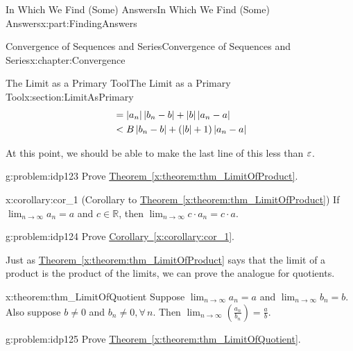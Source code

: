 \begin{partptx}{In Which We Find (Some) Answers}{}{In Which We Find (Some) Answers}{}{}{x:part:FindingAnswers}
\begin{chapterptx}{Convergence of Sequences and Series}{}{Convergence of Sequences and Series}{}{}{x:chapter:Convergence}
\begin{sectionptx}{The Limit as a Primary Tool}{}{The Limit as a Primary Tool}{}{}{x:section:LimitAsPrimary}
\begin{align*}
				& =\left|a_n\right|\left|b_n-b\right|+\left|b\right|\left|a_n-a\right|\\
				& < B\left|b_n-b\right|+\left(\left|b\right|+1\right)\left|a_n-a\right|
			\end{align*}
			\par
			At this point, we should be able to make the last line of this less than \(\varepsilon\).%
			\par
			\begin{problem}{}{g:problem:idp123}%
				 Prove \hyperref[x:theorem:thm_LimitOfProduct]{Theorem~{\xreffont\ref{x:theorem:thm_LimitOfProduct}}}.%
			\end{problem}
			\begin{corollary}{}{}{x:corollary:cor_1}%
				(Corollary to \hyperref[x:theorem:thm_LimitOfProduct]{Theorem~{\xreffont\ref{x:theorem:thm_LimitOfProduct}}}) If \(\displaystyle\lim_{n\rightarrow\infty}a_n=a\) and \(c\in\mathbb{R}\), then \(\displaystyle\lim_{n\rightarrow\infty}c\cdot a_n=c\cdot a\).%
			\end{corollary}
			\begin{problem}{}{g:problem:idp124}%
				 Prove  \hyperref[x:corollary:cor_1]{Corollary~{\xreffont\ref{x:corollary:cor_1}}}.%
			\end{problem}
			Just as \hyperref[x:theorem:thm_LimitOfProduct]{Theorem~{\xreffont\ref{x:theorem:thm_LimitOfProduct}}} says that the limit of a product is the product of the limits, we can prove the analogue for quotients.%
			\begin{theorem}{}{}{x:theorem:thm_LimitOfQuotient}%
				 Suppose \(\displaystyle\lim_{n\rightarrow\infty}a_n=a\) and \(\displaystyle\lim_{n\rightarrow\infty}b_n=b\). Also suppose \(b\neq 0\) and \(b_n\neq 0,\forall\,n\). Then \(\displaystyle\lim_{n\rightarrow\infty}\left(\frac{a_n}{b_n}\right)=\frac{a}{b}\).%
			\end{theorem}
			\begin{problem}{}{g:problem:idp125}%
				 Prove \hyperref[x:theorem:thm_LimitOfQuotient]{Theorem~{\xreffont\ref{x:theorem:thm_LimitOfQuotient}}}.%
				\par
				\par

\end{problem}
\end{sectionptx}
\end{chapterptx}
\end{partptx}
